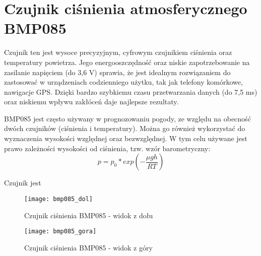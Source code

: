 \chapter{Czujnik ciśnienia atmosferycznego BMP085}
Czujnik ten jest wysoce precyzyjnym, cyfrowym czujnikiem ciśnienia oraz temperatury powietrza. Jego energooszczędność oraz niskie zapotrzebowanie na zasilanie napięciem (do 3,6 V) sprawia, że jest idealnym rozwiązaniem do zastosować w urządzeniach codzienniego użytku, tak jak telefony komórkowe, nawigacje GPS. Dzięki bardzo szybkiemu czasu przetwarzania danych (do 7,5 ms) oraz niskiemu wpływu zakłóceń daje najlepsze rezultaty.


BMP085 jest często używany w prognozowaniu pogody, ze względu na obecność dwóch czujników (ciśnienia i temperatury). Można go również wykorzystać do wyznaczenia wysokości względnej oraz bezwzględnej. W tym celu używane jest prawo zależności wysokości od ciśnienia, tzw. wzór barometryczny:
$$ p = p_{0} * exp(-\frac{\mu g h}{RT}) $$


Czujnik jest 
\begin{figure}[h]
\centering
\texttt{[image: bmp085\_dol]}
\caption{Czujnik ciśnienia BMP085 - widok z dołu}
\label{fig:bmp085_dol}
\end{figure}

\begin{figure}[h]
\centering
\texttt{[image: bmp085\_gora]}
\caption{Czujnik ciśnienia BMP085 - widok z góry}
\label{fig:bmp085_gora}
\end{figure}